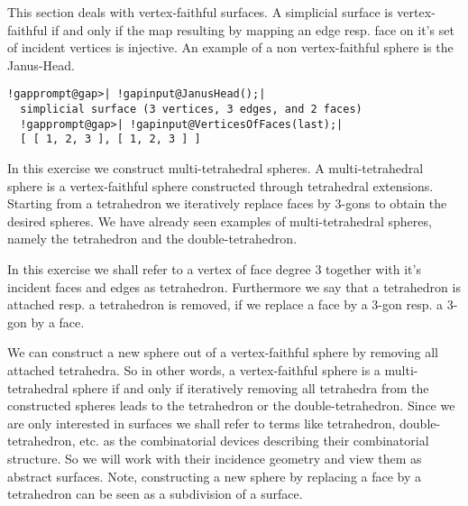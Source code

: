 \documentclass[a4paper,11pt]{report}
\begin{document}
{{ This section deals with vertex-faithful surfaces. A simplicial surface is
vertex-faithful if and only if the map resulting by mapping an edge resp. face
on it's set of incident vertices is injective. An example of a non
vertex-faithful sphere is the Janus-Head. 

 
\begin{center}

\end{center}
 

 
\begin{Verbatim}[commandchars=!@|,fontsize=\small,frame=single,label=Example]
  !gapprompt@gap>| !gapinput@JanusHead();|
  simplicial surface (3 vertices, 3 edges, and 2 faces)
  !gapprompt@gap>| !gapinput@VerticesOfFaces(last);|
  [ [ 1, 2, 3 ], [ 1, 2, 3 ] ]
\end{Verbatim}
 

 In this exercise we construct multi-tetrahedral spheres. A multi-tetrahedral
sphere is a vertex-faithful sphere constructed through tetrahedral extensions.
Starting from a tetrahedron we iteratively replace faces by 3-gons to obtain
the desired spheres. We have already seen examples of multi-tetrahedral
spheres, namely the tetrahedron and the double-tetrahedron. 

 
\begin{center}

\end{center}
 

 In this exercise we shall refer to a vertex of face degree 3 together with
it's incident faces and edges as tetrahedron. Furthermore we say that a
tetrahedron is attached resp. a tetrahedron is removed, if we replace a face
by a 3-gon resp. a 3-gon by a face. 

 
\begin{center}

\end{center}
 

 We can construct a new sphere out of a vertex-faithful sphere by removing all
attached tetrahedra. So in other words, a vertex-faithful sphere is a
multi-tetrahedral sphere if and only if iteratively removing all tetrahedra
from the constructed spheres leads to the tetrahedron or the
double-tetrahedron. Since we are only interested in surfaces we shall refer to
terms like tetrahedron, double- tetrahedron, etc. as the combinatorial devices
describing their combinatorial structure. So we will work with their incidence
geometry and view them as abstract surfaces. Note, constructing a new sphere
by replacing a face by a tetrahedron can be seen as a subdivision of a
surface. 

}}
\end{document}
